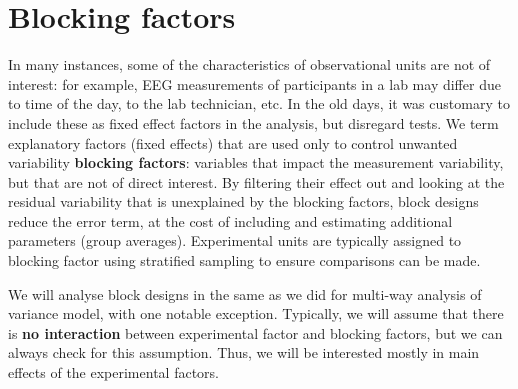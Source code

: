\documentclass[
  11pt,
  letterpaper,
]{scrbook}
\theoremstyle{definition}
\theoremstyle{definition}
\theoremstyle{remark}
\begin{document}
\section{Blocking factors}\label{blocking-factors}

In many instances, some of the characteristics of observational units
are not of interest: for example, EEG measurements of participants in a
lab may differ due to time of the day, to the lab technician, etc. In
the old days, it was customary to include these as fixed effect factors
in the analysis, but disregard tests. We term explanatory factors (fixed
effects) that are used only to control unwanted variability
\textbf{blocking factors}: variables that impact the measurement
variability, but that are not of direct interest. By filtering their
effect out and looking at the residual variability that is unexplained
by the blocking factors, block designs reduce the error term, at the
cost of including and estimating additional parameters (group averages).
Experimental units are typically assigned to blocking factor using
stratified sampling to ensure comparisons can be made.

We will analyse block designs in the same as we did for multi-way
analysis of variance model, with one notable exception. Typically, we
will assume that there is \textbf{no interaction} between experimental
factor and blocking factors, but we can always check for this
assumption. Thus, we will be interested mostly in main effects of the
experimental factors.
\end{document}
